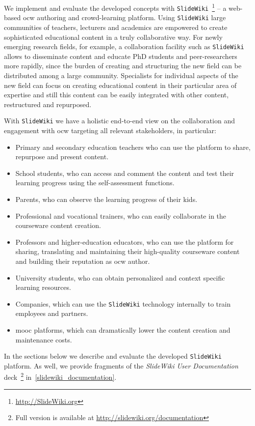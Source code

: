 \documentclass[PhD, Submit, ngerman,UKenglish,table]{scrbook}
\begin{document}
We implement and evaluate the developed concepts with \texttt{SlideWiki}~\footnote{\url{http://SlideWiki.org}} -- a web-based \gls{ocw} authoring and crowd-learning platform.
Using \texttt{SlideWiki} large communities of teachers, lecturers and academics are empowered to create sophisticated educational content in a truly collaborative way.
For newly emerging research fields, for example, a collaboration facility such as \texttt{SlideWiki} allows to disseminate content and educate PhD students and peer-researchers more rapidly, since the burden of creating and structuring the new field can be distributed among a large community.
Specialists for individual aspects of the new field can focus on creating educational content in their particular area of expertise and still this content can be easily integrated with other content, restructured and repurposed.

With \texttt{SlideWiki} we have a holistic end-to-end view on the collaboration and engagement with \gls{ocw} targeting all relevant stakeholders, in particular:
\begin{itemize}
\item Primary and secondary education teachers who can use the platform to share, repurpose and present content.
\item School students, who can access and comment the content and test their learning progress using the self-assessment functions.
\item Parents, who can observe the learning progress of their kids.
\item Professional and vocational trainers, who can easily collaborate in the courseware content creation.
\item Professors and higher-education educators, who can use the platform for sharing, translating and maintaining their high-quality courseware content and building their reputation as \gls{ocw} author.
\item University students, who can obtain personalized and context specific learning resources.
\item Companies, which can use the \texttt{SlideWiki} technology internally to train employees and partners.
\item \gls{mooc} platforms, which can dramatically lower the content creation and maintenance costs.
\end{itemize}

In the sections below we describe and evaluate the developed \texttt{SlideWiki} platform.
As well, we provide fragments of the \emph{SlideWiki User Documentation} deck~\footnote{Full version is available at \url{http://slidewiki.org/documentation}} in~\autoref{slidewiki_documentation}.
   
\end{document}
